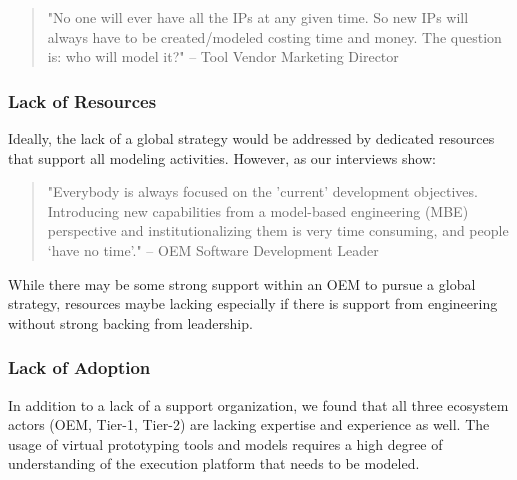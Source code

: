 \begin{quote}
"No one will ever have all the IPs at any given time. So new IPs will always have to be created/modeled costing time and money. The question is: who will model it?"
-- Tool Vendor Marketing Director
\end{quote}

\subsubsection*{Lack of Resources}
Ideally, the lack of a global strategy would be addressed by dedicated resources that support all modeling activities.
However, as  our interviews show:

\begin{quote}
"Everybody is always focused on the 'current' development objectives. Introducing new capabilities from a model-based engineering (MBE) perspective and institutionalizing them is very time consuming, and people ‘have no time’." 
-- OEM Software Development Leader
\end{quote}

While there may be some strong support within an OEM to pursue a global strategy, resources maybe lacking especially if there is support from engineering without strong backing from leadership.

\subsubsection*{Lack of Adoption}
In addition to a lack of a support organization,
we found that all three ecosystem actors (OEM, Tier-1, Tier-2) are lacking expertise and experience as well.
The usage of virtual prototyping tools and models requires a high degree of understanding of the execution platform that needs to be modeled.

